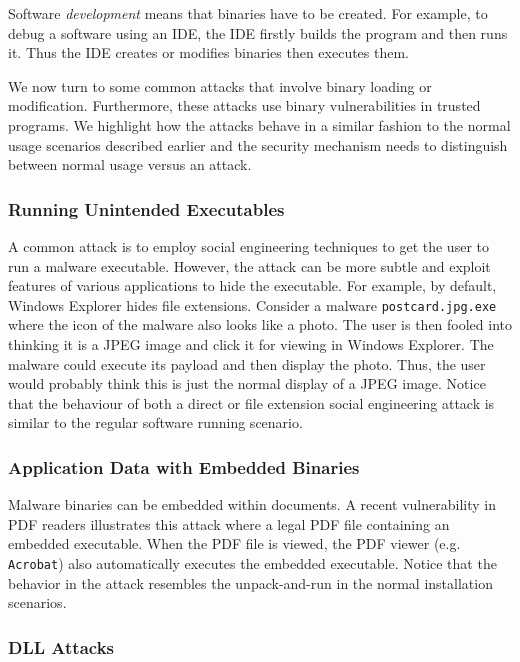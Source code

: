 Software {\em development} means that binaries have to be created.
For example, to debug a software using an IDE,
the IDE firstly builds the program and then runs it.
Thus the IDE creates or modifies binaries then executes them.

We now turn to some common attacks that involve binary loading or modification.
Furthermore, these attacks use binary vulnerabilities in trusted programs.
We highlight how the attacks behave in a similar fashion to the normal usage
scenarios described earlier and the security mechanism needs
to distinguish between normal usage versus an attack.

\subsubsection{Running Unintended Executables}

A common attack is to employ social engineering techniques to get
the user to run a malware executable.
However, the attack can be more subtle and exploit features of various
applications to hide the executable. 
For example, by default, Windows Explorer hides file extensions. 
Consider a malware {\tt postcard.jpg.exe} where
the icon of the malware also looks like a photo.
The user is then fooled into thinking it is a JPEG image and click
it for viewing in Windows Explorer.
The malware could execute its payload and then display
the photo.
Thus, the user would probably think this is just the normal display
of a JPEG image.
Notice that the behaviour of both a direct or file extension social
engineering attack is similar to the regular
software running scenario.

\subsubsection{Application Data with Embedded Binaries}

Malware binaries can be embedded within documents.
A recent vulnerability in PDF readers \cite{pdfattack} illustrates this
attack where a legal PDF file containing an embedded executable.
When the PDF file is viewed, the PDF viewer (e.g. {\tt Acrobat}) also
automatically executes the embedded executable.
Notice that the behavior in the attack
resembles the unpack-and-run in the normal installation scenarios.


\subsubsection{DLL Attacks}

